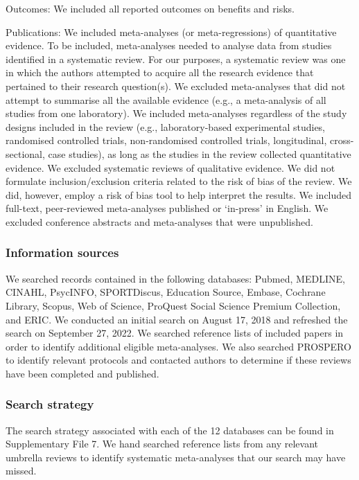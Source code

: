 \documentclass[
  english,
  man]{apa6}
\begin{document}
Outcomes: We included all reported outcomes on benefits and risks.

Publications:
We included meta-analyses (or meta-regressions) of quantitative evidence.
To be included, meta-analyses needed to analyse data from studies identified in a systematic review.
For our purposes, a systematic review was one in which the authors attempted to acquire all the research evidence that pertained to their research question(s).
We excluded meta-analyses that did not attempt to summarise all the available evidence (e.g., a meta-analysis of all studies from one laboratory).
We included meta-analyses regardless of the study designs included in the review (e.g., laboratory-based experimental studies, randomised controlled trials, non-randomised controlled trials, longitudinal, cross-sectional, case studies), as long as the studies in the review collected quantitative evidence.
We excluded systematic reviews of qualitative evidence.
We did not formulate inclusion/exclusion criteria related to the risk of bias of the review.
We did, however, employ a risk of bias tool to help interpret the results.
We included full-text, peer-reviewed meta-analyses published or `in-press' in English.
We excluded conference abstracts and meta-analyses that were unpublished.

\hypertarget{information-sources}{%
\subsubsection{Information sources}\label{information-sources}}

We searched records contained in the following databases: Pubmed, MEDLINE, CINAHL, PsycINFO, SPORTDiscus, Education Source, Embase, Cochrane Library, Scopus, Web of Science, ProQuest Social Science Premium Collection, and ERIC.
We conducted an initial search on August 17, 2018 and refreshed the search on September 27, 2022.
We searched reference lists of included papers in order to identify additional eligible meta-analyses.
We also searched PROSPERO to identify relevant protocols and contacted authors to determine if these reviews have been completed and published.

\hypertarget{search-strategy}{%
\subsubsection{Search strategy}\label{search-strategy}}

The search strategy associated with each of the 12 databases can be found in Supplementary File 7.
We hand searched reference lists from any relevant umbrella reviews to identify systematic meta-analyses that our search may have missed.
\end{document}
